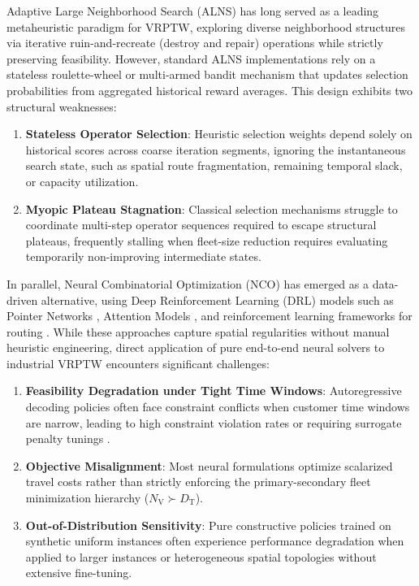 \documentclass{ieeeaccess}
\newcommand{\NV}{{N_\mathrm{V}}}
\newcommand{\TD}{{D_\mathrm{T}}}
\begin{document}
Adaptive Large Neighborhood Search (ALNS) \cite{pisinger2007general, Ropke2006} has long served as a leading metaheuristic paradigm for VRPTW, exploring diverse neighborhood structures via iterative ruin-and-recreate (destroy and repair) operations while strictly preserving feasibility. However, standard ALNS implementations rely on a stateless roulette-wheel or multi-armed bandit mechanism that updates selection probabilities from aggregated historical reward averages. This design exhibits two structural weaknesses:
\begin{enumerate}
    \item \textbf{Stateless Operator Selection}: Heuristic selection weights depend solely on historical scores across coarse iteration segments, ignoring the instantaneous search state, such as spatial route fragmentation, remaining temporal slack, or capacity utilization.
    \item \textbf{Myopic Plateau Stagnation}: Classical selection mechanisms struggle to coordinate multi-step operator sequences required to escape structural plateaus, frequently stalling when fleet-size reduction requires evaluating temporarily non-improving intermediate states.
\end{enumerate}

In parallel, Neural Combinatorial Optimization (NCO) has emerged as a data-driven alternative, using Deep Reinforcement Learning (DRL) models such as Pointer Networks \cite{vinyals2015pointer}, Attention Models \cite{kool2019attention}, and reinforcement learning frameworks for routing \cite{nazari2018reinforcement}. While these approaches capture spatial regularities without manual heuristic engineering, direct application of pure end-to-end neural solvers to industrial VRPTW encounters significant challenges:
\begin{enumerate}
    \item \textbf{Feasibility Degradation under Tight Time Windows}: Autoregressive decoding policies often face constraint conflicts when customer time windows are narrow, leading to high constraint violation rates or requiring surrogate penalty tunings \cite{falkner2020learning, lin2021deep}.
    \item \textbf{Objective Misalignment}: Most neural formulations optimize scalarized travel costs rather than strictly enforcing the primary-secondary fleet minimization hierarchy ($\NV \succ \TD$).
    \item \textbf{Out-of-Distribution Sensitivity}: Pure constructive policies trained on synthetic uniform instances often experience performance degradation when applied to larger instances or heterogeneous spatial topologies without extensive fine-tuning.
\end{enumerate}
\end{document}
